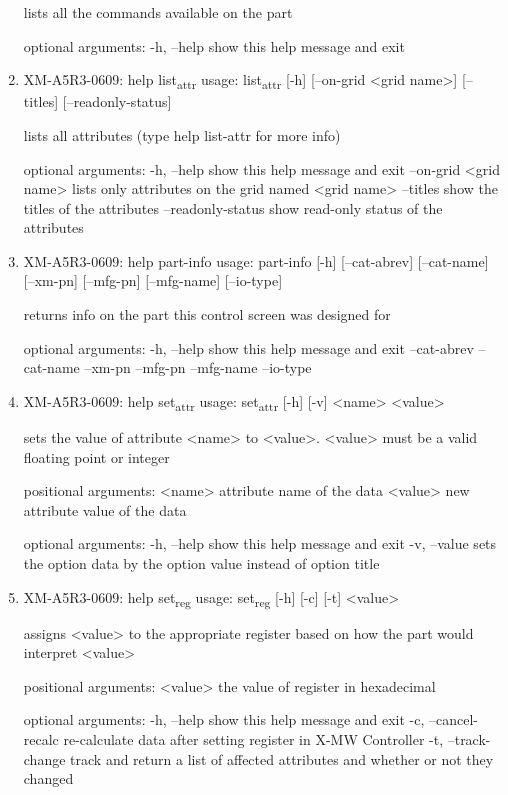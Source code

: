 \documentclass[11pt]{article}
\begin{document}
\begin{enumerate}
lists all the commands available on the part

optional arguments:
  -h, --help  show this help message and exit

\item XM-A5R3-0609: help list\textsubscript{attr}
\label{sec:orgb5f1696}
usage: list\textsubscript{attr} [-h] [--on-grid <grid name>] [--titles] [--readonly-status]

lists all attributes (type help list-attr for more info)

optional arguments:
  -h, --help            show this help message and exit
  --on-grid <grid name>
                        lists only attributes on the grid named <grid name>
  --titles              show the titles of the attributes
  --readonly-status     show read-only status of the attributes

\item XM-A5R3-0609: help part-info
\label{sec:orgbf3c09b}
usage: part-info  [-h] [--cat-abrev] [--cat-name] [--xm-pn] [--mfg-pn] [--mfg-name]
        [--io-type]

returns info on the part this control screen was designed for

optional arguments:
  -h, --help   show this help message and exit
  --cat-abrev
  --cat-name
  --xm-pn
  --mfg-pn
  --mfg-name
  --io-type

\item XM-A5R3-0609: help set\textsubscript{attr}
\label{sec:org0eecbba}
usage: set\textsubscript{attr} [-h] [-v] <name> <value>

sets the value of attribute <name> to <value>. <value> must be a valid
floating point or integer

positional arguments:
  <name>       attribute name of the data
  <value>      new attribute value of the data

optional arguments:
  -h, --help   show this help message and exit
  -v, --value  sets the option data by the option value instead of option
               title

\item XM-A5R3-0609: help set\textsubscript{reg}
\label{sec:org8148c8e}
usage: set\textsubscript{reg} [-h] [-c] [-t] <value>

assigns <value> to the appropriate register based on how the part would
interpret <value>

positional arguments:
  <value>              the value of register in hexadecimal

optional arguments:
  -h, --help           show this help message and exit
  -c, --cancel-recalc  re-calculate data after setting register in X-MW
                       Controller
  -t, --track-change   track and return a list of affected attributes and
                       whether or not they changed


\end{enumerate}
\end{document}
